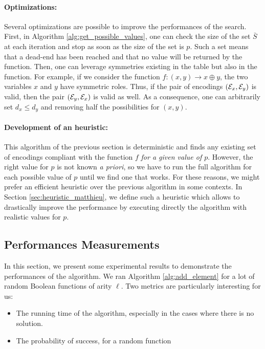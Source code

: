 \paragraph{Optimizations:} Several optimizations are possible to improve the performances of the search. First, in Algorithm \ref{alg:get_possible_values}, one can check the size of the set $\bar S$ at each iteration and stop as soon as the size of the set is $p$. Such a set means that a dead-end has been reached and that no value will be returned by the function. Then, one can leverage symmetries existing in the table but also in the function. For example, if we consider the function $f: (x, y) \longrightarrow x \oplus y$, the two variables $x$ and $y$ have symmetric roles. Thus, if the pair of encodings $(\mathcal{E}_x, \mathcal{E}_y)$ is valid, then the pair $(\mathcal{E}_y, \mathcal{E}_x)$ is valid as well. As a consequence, one can arbitrarily set $d_x \le d_y$ and removing half the possibilities for $(x, y)$.




\paragraph{Development of an heuristic:} This algorithm of the previous section is deterministic and finds any existing set of encodings compliant with the function $f$ \emph{for a given value of $p$}. However, the right value for $p$ is not known \emph{a priori}, so we have to run the full algorithm for each possible value of $p$ until we find one that works. For these reasons, we might prefer an efficient heuristic over the previous algorithm in some contexts. In Section \ref{sec:heuristic_matthieu}, we define such a heuristic which allows to drastically improve the performance by executing directly the algorithm with realistic values for $p$. 




\subsection{Performances Measurements}

In this section, we present some experimental results to demonstrate the performances of the algorithm. We ran Algorithm \ref{alg:add_element} for a lot of random Boolean functions of arity $\ell$. Two metrics are particularly interesting for us:
\begin{itemize}
    \item The running time of the algorithm, especially in the cases where there is no solution.
    \item The probability of success, for a random function
\end{itemize}


